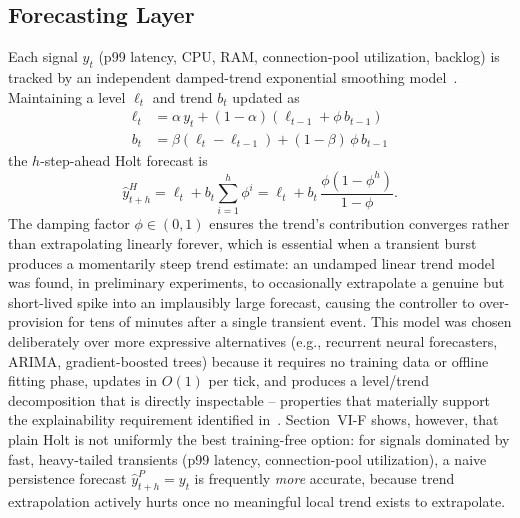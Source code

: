 \documentclass[conference]{IEEEtran}
\begin{document}
\subsection{Forecasting Layer}

Each signal $y_t$ (p99 latency, CPU, RAM, connection-pool utilization, backlog) is tracked by an
independent damped-trend exponential smoothing model~\cite{gardner1985}. Maintaining a level $\ell_t$
and trend $b_t$ updated as
\begin{align}
\ell_t &= \alpha\, y_t + (1-\alpha)(\ell_{t-1} + \phi\, b_{t-1}) \\
b_t &= \beta(\ell_t - \ell_{t-1}) + (1-\beta)\,\phi\, b_{t-1}
\end{align}
the $h$-step-ahead Holt forecast is
\begin{equation}
\hat{y}^{H}_{t+h} = \ell_t + b_t \sum_{i=1}^{h}\phi^{i} = \ell_t + b_t\,\frac{\phi(1-\phi^{h})}{1-\phi}.
\end{equation}
The damping factor $\phi \in (0,1)$ ensures the trend's contribution converges rather than
extrapolating linearly forever, which is essential when a transient burst produces a momentarily steep
trend estimate: an undamped linear trend model was found, in preliminary experiments, to occasionally
extrapolate a genuine but short-lived spike into an implausibly large forecast, causing the controller
to over-provision for tens of minutes after a single transient event. This model was chosen deliberately
over more expressive alternatives (e.g., recurrent neural forecasters, ARIMA, gradient-boosted trees)
because it requires no training data or offline fitting phase, updates in $O(1)$ per tick, and produces
a level/trend decomposition that is directly inspectable -- properties that materially support the
explainability requirement identified in~\cite{ref_base}. Section~VI-F shows, however, that plain Holt
is not uniformly the best training-free option: for signals dominated by fast, heavy-tailed transients
(p99 latency, connection-pool utilization), a naive persistence forecast $\hat y^{P}_{t+h}=y_t$ is
frequently \emph{more} accurate, because trend extrapolation actively hurts once no meaningful local
trend exists to extrapolate.
\end{document}
